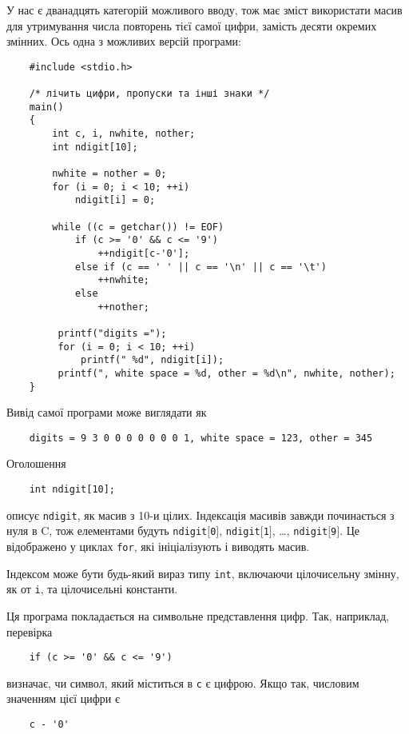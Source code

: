 \documentclass[a4paper,12pt]{book}
\begin{document}
  У нас є дванадцять категорій можливого вводу, тож має зміст використати масив для
  утримування числа повторень тієї самої цифри, замість десяти окремих змінних. Ось одна з
  можливих версій програми:
  \begin{verbatim}
    #include <stdio.h>

    /* лічить цифри, пропуски та інші знаки */
    main()
    {
        int c, i, nwhite, nother;
        int ndigit[10];

        nwhite = nother = 0;
        for (i = 0; i < 10; ++i)
            ndigit[i] = 0;

        while ((c = getchar()) != EOF)
            if (c >= '0' && c <= '9')
                ++ndigit[c-'0'];
            else if (c == ' ' || c == '\n' || c == '\t')
                ++nwhite;
            else
                ++nother;

         printf("digits =");
         for (i = 0; i < 10; ++i)
             printf(" %d", ndigit[i]);
         printf(", white space = %d, other = %d\n", nwhite, nother);
    }
  \end{verbatim}

  Вивід самої програми може виглядати як
  \begin{verbatim}
    digits = 9 3 0 0 0 0 0 0 0 1, white space = 123, other = 345
  \end{verbatim}

  Оголошення
  \begin{verbatim}
    int ndigit[10];
  \end{verbatim}
  описує \texttt{ndigit}, як масив з 10-и цілих. Індексація масивів завжди починається з
  нуля в C, тож елементами будуть \texttt{ndigit\mbox{$[$}0\mbox{$]$}},
  \texttt{ndigit\mbox{$[$}1\mbox{$]$}}, \ldots, \texttt{ndigit\mbox{$[$}9\mbox{$]$}}. Це
  відображено у циклах \texttt{for}, які ініціалізують і виводять масив.

  Індексом може бути будь-який вираз типу \texttt{int}, включаючи цілочисельну змінну, як
  от \texttt{i}, та цілочисельні константи.

  Ця програма покладається на символьне представлення цифр. Так, наприклад, перевірка
  \begin{verbatim}
    if (c >= '0' && c <= '9')
  \end{verbatim}
  визначає, чи символ, який міститься в
  \texttt{c} є цифрою. Якщо так, числовим значенням цієї цифри є
  \begin{verbatim}
    c - '0'
  \end{verbatim}
\end{document}
